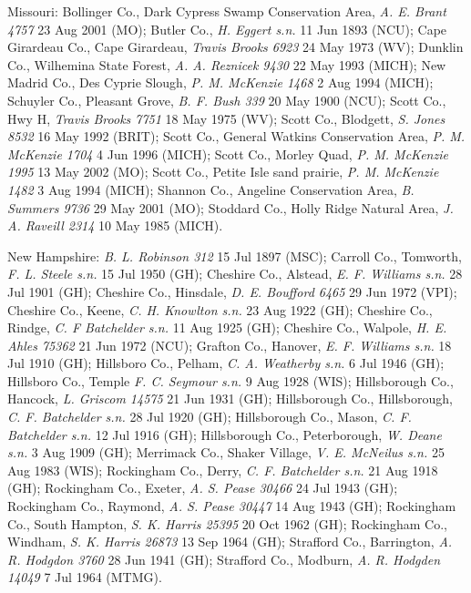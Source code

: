 \documentclass{article}
\begin{document}
Missouri:
Bollinger Co., Dark Cypress Swamp Conservation Area, \textit{A. E. Brant 4757} 23 Aug 2001 (MO);
Butler Co., \textit{H. Eggert s.n.} 11 Jun 1893 (NCU);
Cape Girardeau Co., Cape Girardeau, \textit{Travis Brooks 6923} 24 May 1973 (WV);
Dunklin Co., Wilhemina State Forest, \textit{A. A. Reznicek 9430} 22 May 1993 (MICH);
New Madrid Co., Des Cyprie Slough, \textit{P. M. McKenzie 1468} 2 Aug 1994 (MICH);
Schuyler Co., Pleasant Grove, \textit{B. F. Bush 339} 20 May 1900 (NCU);
Scott Co., Hwy H, \textit{Travis Brooks 7751} 18 May 1975 (WV);
Scott Co., Blodgett, \textit{S. Jones 8532} 16 May 1992 (BRIT);
Scott Co., General Watkins Conservation Area, \textit{P. M. McKenzie 1704} 4 Jun 1996 (MICH);
Scott Co., Morley Quad, \textit{P. M. McKenzie 1995} 13 May 2002 (MO);
Scott Co., Petite Isle sand prairie, \textit{P. M. McKenzie 1482} 3 Aug 1994 (MICH);
Shannon Co., Angeline Conservation Area, \textit{B. Summers 9736} 29 May 2001 (MO);
Stoddard Co., Holly Ridge Natural Area, \textit{J. A. Raveill 2314} 10 May 1985 (MICH).

New Hampshire:
\textit{B. L. Robinson 312} 15 Jul 1897 (MSC);
Carroll Co., Tomworth, \textit{F. L. Steele s.n.} 15 Jul 1950 (GH);
Cheshire Co., Alstead, \textit{E. F. Williams s.n.} 28 Jul 1901 (GH);
Cheshire Co., Hinsdale, \textit{D. E. Boufford 6465} 29 Jun 1972 (VPI);
Cheshire Co., Keene, \textit{C. H. Knowlton s.n.} 23 Aug 1922 (GH);
Cheshire Co., Rindge, \textit{C. F Batchelder s.n.} 11 Aug 1925 (GH);
Cheshire Co., Walpole, \textit{H. E. Ahles 75362} 21 Jun 1972 (NCU);
Grafton Co., Hanover, \textit{E. F. Williams s.n.} 18 Jul 1910 (GH);
Hillsboro Co., Pelham, \textit{C. A. Weatherby s.n.} 6 Jul 1946 (GH);
Hillsboro Co., Temple  \textit{F. C. Seymour s.n.} 9 Aug 1928 (WIS);
Hillsborough Co., Hancock, \textit{L. Griscom 14575} 21 Jun 1931 (GH);
Hillsborough Co., Hillsborough, \textit{C. F. Batchelder s.n.} 28 Jul 1920 (GH);
Hillsborough Co., Mason, \textit{C. F. Batchelder s.n.} 12 Jul 1916 (GH);
Hillsborough Co., Peterborough, \textit{W. Deane s.n.} 3 Aug 1909 (GH);
Merrimack Co., Shaker Village, \textit{V. E. McNeilus s.n.} 25 Aug 1983 (WIS);
Rockingham Co., Derry, \textit{C. F. Batchelder s.n.} 21 Aug 1918 (GH);
Rockingham Co., Exeter, \textit{A. S. Pease 30466} 24 Jul 1943 (GH);
Rockingham Co., Raymond, \textit{A. S. Pease 30447} 14 Aug 1943 (GH);
Rockingham Co., South Hampton, \textit{S. K. Harris 25395} 20 Oct 1962 (GH);
Rockingham Co., Windham, \textit{S. K. Harris 26873} 13 Sep 1964 (GH);
Strafford Co., Barrington, \textit{A. R. Hodgdon 3760} 28 Jun 1941 (GH);
Strafford Co., Modburn, \textit{A. R. Hodgden 14049} 7 Jul 1964 (MTMG).
\end{document}
